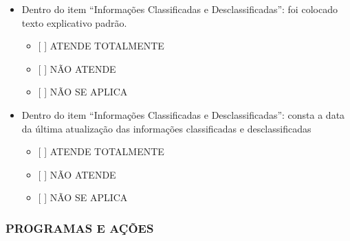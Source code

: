 \documentclass[]{book}
\providecommand{\tightlist}{%
  \setlength{\itemsep}{0pt}\setlength{\parskip}{0pt}}
\begin{document}
\begin{itemize}
\tightlist
\item
  Dentro do item ``Informações Classificadas e Desclassificadas'': foi colocado texto explicativo padrão.

  \begin{itemize}
  \tightlist
  \item
    {[} {]} ATENDE TOTALMENTE
  \item
    {[} {]} NÃO ATENDE
  \item
    {[} {]} NÃO SE APLICA
  \end{itemize}
\item
  Dentro do item ``Informações Classificadas e Desclassificadas'': consta a data da última atualização das informações classificadas e desclassificadas

  \begin{itemize}
  \tightlist
  \item
    {[} {]} ATENDE TOTALMENTE
  \item
    {[} {]} NÃO ATENDE
  \item
    {[} {]} NÃO SE APLICA
  \end{itemize}
\end{itemize}

\hypertarget{programas-e-auxe7uxf5es-1}{%
\subsubsection*{PROGRAMAS E AÇÕES}\label{programas-e-auxe7uxf5es-1}}
\end{document}
